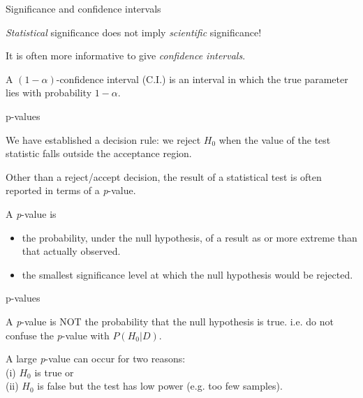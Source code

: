 \documentclass{beamer}
\begin{document}
\begin{frame}{Significance and confidence intervals}

	\begin{block}{}
		\textit{Statistical} significance does not imply \textit{scientific} significance!
	\end{block}

	\vskip 1cm

	It is often more informative to give \textit{confidence intervals}.
	
	A $(1 - \alpha)$-confidence interval (C.I.) is an interval in which the true
	parameter lies with probability $1 - \alpha$.
	
\end{frame}

\begin{frame}{p-values}

	We have established a decision rule: we reject $H_0$ when the value of the
	test statistic falls outside the acceptance region.

	Other than a reject/accept decision, the result of a statistical test is often
	reported in terms of a \textit{p}-value.

	\vskip 0.5cm
	
	A \textit{p}-value is
	\begin{itemize}
		\item the probability, under the null hypothesis, of a result as or more
		extreme than that actually observed.
		\item the smallest significance level at which the null hypothesis would be rejected.
	\end{itemize}

\end{frame}

\begin{frame}{p-values}

	A \textit{p}-value is NOT the probability that the null hypothesis is true. i.e. do not confuse
	the \textit{p}-value with $P(H_0 |D)$.

	\vskip 1cm

	A large \textit{p}-value can occur for two reasons:\\ 
	(i) $H_0$ is true or \\
	(ii) $H_0$ is false but the test has low power (e.g. too few samples).

\end{frame}
\end{document}

